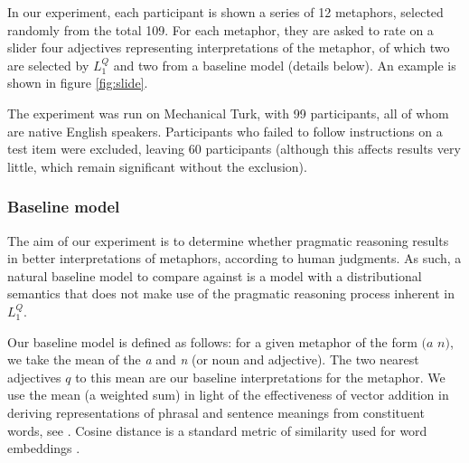 \documentclass[OpenMind]{stjour}
\newcommand{\Listener}{L}
\newcommand{\QLONE}{\Listener_{{1}}^{{Q}}}
\begin{document}
		In our experiment, each participant is shown a series of 12 metaphors, selected randomly from the total 109. For each metaphor, they are asked to rate on a slider four adjectives representing interpretations of the metaphor, of which two are selected by $\QLONE$ and two from a baseline model (details below). An example is shown in figure \ref{fig:slide}.

		The experiment was run on Mechanical Turk, with 99 participants, all of whom are native English speakers. Participants who failed to follow instructions on a test item were excluded, leaving 60 participants (although this affects results very little, which remain significant without the exclusion).
	
	\subsubsection{Baseline model}




		The aim of our experiment is to determine whether pragmatic reasoning results in better interpretations of metaphors, according to human judgments. As such, a natural baseline model to compare against is a model with a distributional semantics that does not make use of the pragmatic reasoning process inherent in $\QLONE$.

		Our baseline model is defined as follows: for a given metaphor of the form $(a$ $n)$, we take the mean of the \emph{a} and \emph{n} (or noun and adjective). The two nearest adjectives $q$ to this mean are our baseline interpretations for the metaphor. We use the mean (a weighted sum) in light of the effectiveness of vector addition in deriving representations of phrasal and sentence meanings from constituent words, see \citep{mitchell2010composition,grefenstette2013category,socher2013recursive}. Cosine distance is a standard metric of similarity used for word embeddings \citep{pennington2014glove}.



			


\end{document}
